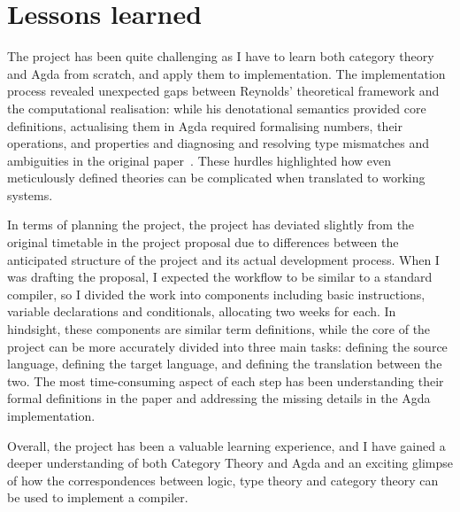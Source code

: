 \documentclass[12pt,a4paper]{report}
\theoremstyle{definition}
\begin{document}
    \section{Lessons learned}
    The project has been quite challenging as I have to learn both category theory and Agda from scratch, and apply them to implementation. The implementation process revealed unexpected gaps between Reynolds' theoretical framework and the computational realisation: while his denotational semantics provided core definitions, actualising them in Agda required formalising numbers, their operations, and properties and diagnosing and resolving type mismatches and ambiguities in the original paper~\autocite{Reynolds}. These hurdles highlighted how even meticulously defined theories can be complicated when translated to working systems.


    In terms of planning the project, the project has deviated slightly from the original timetable in the project proposal due to differences
    between the anticipated structure of the project and its actual development process. When I was drafting the proposal, I expected the workflow to be similar to a standard compiler, so I divided the work into components including basic instructions, variable declarations and conditionals, allocating two weeks for each. In hindsight, these components are similar term definitions, while the core of the project can be more accurately divided into three main tasks: defining the source language, defining the target language, and defining the translation between the two. The most time-consuming aspect of each step has been understanding their formal definitions in the paper and addressing the missing details in the Agda implementation.

    Overall, the project has been a valuable learning experience, and I have gained a deeper understanding of both Category Theory and Agda and an exciting glimpse of how the correspondences between logic, type theory and category theory can be used to implement a compiler.
\end{document}

